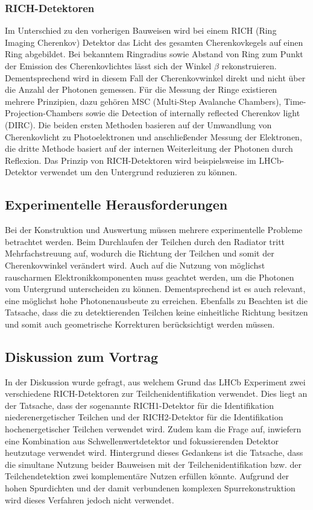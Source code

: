 \subsubsection{RICH-Detektoren}
Im Unterschied zu den vorherigen Bauweisen wird bei einem RICH (Ring Imaging Cherenkov) Detektor das Licht des gesamten Cherenkovkegels auf einen Ring abgebildet.
Bei bekanntem Ringradius sowie Abstand von Ring zum Punkt der Emission des Cherenkovlichtes lässt sich der Winkel $\beta$ rekonstruieren.
Dementsprechend wird in diesem Fall der Cherenkovwinkel direkt und nicht über die Anzahl der Photonen gemessen.
Für die Messung der Ringe existieren mehrere Prinzipien, dazu gehören MSC (Multi-Step Avalanche Chambers), Time-Projection-Chambers sowie die Detection of internally reflected Cherenkov light (DIRC).
Die beiden ersten Methoden basieren auf der Umwandlung von Cherenkovlicht zu Photoelektronen und anschließender Messung der Elektronen, die dritte Methode basiert auf der internen Weiterleitung der Photonen durch Reflexion.
Das Prinzip von RICH-Detektoren wird beispielsweise im LHCb-Detektor verwendet um den Untergrund reduzieren zu können.

\subsection{Experimentelle Herausforderungen}
Bei der Konstruktion und Auswertung müssen mehrere experimentelle Probleme betrachtet werden.
Beim Durchlaufen der Teilchen durch den Radiator tritt Mehrfachstreuung auf, wodurch die Richtung der Teilchen und somit der Cherenkovwinkel verändert wird.
Auch auf die Nutzung von möglichst rauscharmen Elektronikkomponenten muss geachtet werden, um die Photonen vom Untergrund unterscheiden zu können.
Dementsprechend ist es auch relevant, eine möglichst hohe Photonenausbeute zu erreichen. 
Ebenfalls zu Beachten ist die Tatsache, dass die zu detektierenden Teilchen keine einheitliche Richtung besitzen und somit auch geometrische Korrekturen berücksichtigt werden müssen. 

\subsection{Diskussion zum Vortrag}
In der Diskussion wurde gefragt, aus welchem Grund das LHCb Experiment zwei verschiedene RICH-Detektoren zur Teilchenidentifikation verwendet.
Dies liegt an der Tatsache, dass der sogenannte RICH1-Detektor für die Identifikation niederenergetischer Teilchen und der RICH2-Detektor für die Identifikation hochenergetischer Teilchen verwendet wird.
Zudem kam die Frage auf, inwiefern eine Kombination aus Schwellenwertdetektor und fokussierenden Detektor heutzutage verwendet wird.
Hintergrund dieses Gedankens ist die Tatsache, dass die simultane Nutzung beider Bauweisen mit der Teilchenidentifikation bzw. der Teilchendetektion zwei komplementäre Nutzen erfüllen könnte.
Aufgrund der hohen Spurdichten und der damit verbundenen komplexen Spurrekonstruktion wird dieses Verfahren jedoch nicht verwendet.